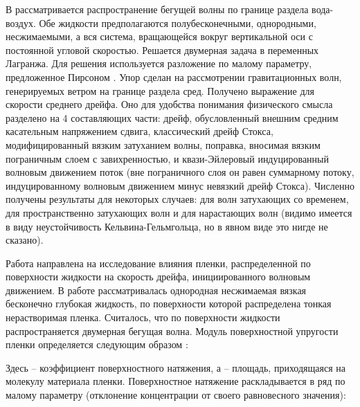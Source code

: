 В \cite{weber1993transient} рассматривается распространение бегущей волны по границе раздела вода-воздух. Обе жидкости предполагаются полубесконечными, однородными, несжимаемыми, а вся система, вращающейся вокруг вертикальной оси с постоянной угловой скоростью. Решается двумерная задача в переменных Лагранжа. Для решения используется разложение по малому параметру, предложенное Пирсоном \cite{pierson1962perturbation}. Упор сделан на рассмотрении гравитационных волн, генерируемых ветром на границе раздела сред. Получено выражение для скорости среднего дрейфа. Оно для удобства понимания физического смысла разделено на 4 составляющих части: дрейф, обусловленный внешним средним касательным напряжением сдвига, классический дрейф Стокса, модифицированный вязким затуханием волны, поправка, вносимая вязким пограничным слоем с завихренностью, и квази-Эйлеровый индуцированный волновым движением поток (вне пограничного слоя он равен суммарному потоку, индуцированному волновым движением минус невязкий дрейф Стокса). 
Численно получены результаты для некоторых случаев: для волн затухающих со временем, для пространственно затухающих волн и для нарастающих волн (видимо имеется в виду неустойчивость Кельвина-Гельмгольца, но в явном виде это нигде не сказано).

Работа \cite{weber1995effect} направлена на исследование влияния пленки, распределенной по поверхности жидкости на скорость дрейфа, инициированного волновым движением.
В работе рассматривалась однородная несжимаемая вязкая бесконечно глубокая жидкость, по поверхности которой распределена тонкая нерастворимая пленка. Считалось, что по поверхности жидкости распространяется двумерная бегущая волна. Модуль поверхностной упругости пленки   определяется следующим образом \cite{lucassen1969eh}:

Здесь   – коэффициент поверхностного натяжения, а   – площадь, приходящаяся на молекулу материала пленки. 
Поверхностное натяжение   раскладывается в ряд по малому параметру   (отклонение концентрации от своего равновесного значения):

